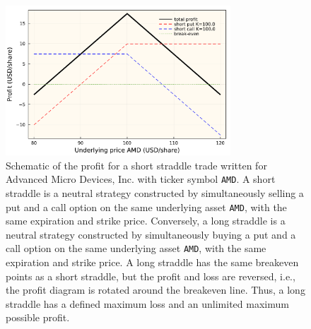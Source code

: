 \documentclass[11pt]{article}
\theoremstyle{definition}
\begin{document}
\begin{figure}[h]
    \centering
    \includegraphics[width=0.75\textwidth]{./figs/Fig-AMD-Profit-Short-Straddle.pdf}
    \caption{Schematic of the profit for a short straddle trade written for Advanced Micro Devices, Inc. with ticker symbol \texttt{AMD}.
	A short straddle is a neutral strategy constructed by simultaneously selling a put and a call option on the same underlying asset \texttt{AMD}, with the same expiration and strike price.
	Conversely, a long straddle is a neutral strategy constructed by simultaneously buying a put and a call option on the same underlying asset \texttt{AMD}, with the same expiration and strike price.
	A long straddle has the same breakeven points as a short straddle, but the profit and loss are reversed, i.e., the profit diagram is rotated around the breakeven line.
	Thus, a long straddle has a defined maximum loss and an unlimited maximum possible profit.
	}\label{fig:options-short-straddle-profit}
\end{figure}
\end{document}
